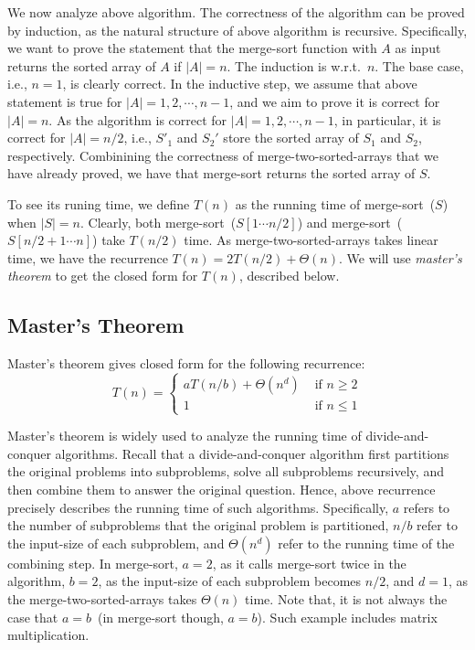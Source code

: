 We now analyze above algorithm.
The correctness of the algorithm can be proved by induction, as the natural structure of above algorithm is recursive.
Specifically, we want to prove the statement that the merge-sort function with $A$ as input returns the sorted array of $A$ if $|A| = n$.
The induction is w.r.t.\ $n$. The base case, i.e., $n = 1$, is clearly correct.
In the inductive step, we assume that above statement is true for $|A| = 1, 2, \cdots, n - 1$, and we aim to prove it is correct for $|A| = n$.
As the algorithm is correct for $|A| = 1, 2, \cdots, n - 1$, in particular, it is correct for $|A| = n/2$, i.e.,
$S'_1$ and $S_2'$ store the sorted array of $S_1$ and $S_2$, respectively.
Combinining the correctness of merge-two-sorted-arrays that we have already proved,
we have that merge-sort returns the sorted array of $S$.

To see its runing time, we define $T(n)$ as the running time of merge-sort~($S$) when $|S| = n$.
Clearly, both merge-sort~($S[1\cdots n/2]$) and
merge-sort~($S[n/2+1\cdots n]$) take $T(n/2)$ time.
As merge-two-sorted-arrays takes linear time, we have the recurrence $T(n) = 2T(n/2) + \Theta(n)$.
We will use \emph{master's theorem} to get the closed form for $T(n)$, described below.

\subsection*{Master's Theorem}

Master's theorem gives closed form for the following recurrence:
\begin{displaymath}
T(n) = \left\{
\begin{array}{llll}
aT(n/b) + \Theta(n^d)  & \textrm{ if } n \ge 2 \\
1  & \textrm{ if } n \le 1 
\end{array}
\right.
\end{displaymath}

Master's theorem is widely used to analyze the running time of divide-and-conquer algorithms. 
Recall that a divide-and-conquer algorithm
first partitions the original problems into subproblems, solve all subproblems recursively,
and then combine them to answer the original question.
Hence, above recurrence precisely describes the running time of such algorithms.
Specifically, $a$ refers to the number of subproblems that the original problem is partitioned,
$n/b$ refer to the input-size of each subproblem,
and $\Theta(n^d)$ refer to the running time of the combining step.
In merge-sort, $a = 2$, as it calls merge-sort twice in the algorithm,
$b = 2$, as the input-size of each subproblem becomes $n/2$,
and $d = 1$, as the merge-two-sorted-arrays takes $\Theta(n)$ time.
Note that, it is not always the case that $a = b$~(in merge-sort though, $a = b$).
Such example includes matrix multiplication.

